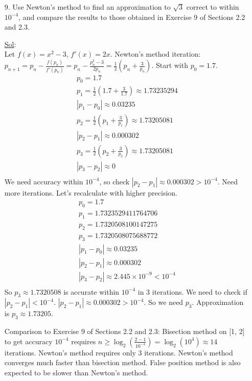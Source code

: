\begin{enumerate}
  \item[9.] Use Newton's method to find an approximation to \(
    \sqrt{3} \) correct to within \( 10^{-4} \), and compare the
    results to those obtained in Exercise 9 of Sections 2.2 and 2.3.

    \underline{Sol}:\\
    Let \( f(x) = x^2 - 3 \), \( f'(x) = 2x \).
    Newton's method iteration: \( p_{n+1} = p_n -
      \frac{f(p_n)}{f'(p_n)} = p_n - \frac{p_n^2 - 3}{2p_n} =
    \frac{1}{2} \left( p_n + \frac{3}{p_n} \right) \).
    Start with \( p_0 = 1.7 \).
    \[
      \begin{array}{l}
        p_0 = 1.7 \\
        p_1 = \frac{1}{2} \left( 1.7 + \frac{3}{1.7} \right) \approx
        1.73235294 \\
        |p_1 - p_0| \approx 0.03235 \\
        p_2 = \frac{1}{2} \left( p_1 + \frac{3}{p_1} \right) \approx
        1.73205081 \\
        |p_2 - p_1| \approx 0.000302 \\
        p_3 = \frac{1}{2} \left( p_2 + \frac{3}{p_2} \right) \approx
        1.73205081 \\
        |p_3 - p_2| \approx 0 \\
      \end{array}
    \]
    We need accuracy within \( 10^{-4} \), so check \( |p_2 - p_1|
    \approx 0.000302 > 10^{-4} \). Need more iterations.
    Let's recalculate with higher precision.
    \[
      \begin{array}{l}
        p_0 = 1.7 \\
        p_1 = 1.7323529411764706 \\
        p_2 = 1.7320508100147275 \\
        p_3 = 1.7320508075688772 \\
        |p_1 - p_0| \approx 0.03235 \\
        |p_2 - p_1| \approx 0.000302 \\
        |p_3 - p_2| \approx 2.445 \times 10^{-9} < 10^{-4} \\
      \end{array}
    \]
    So \( p_3 \approx 1.7320508 \) is accurate within \( 10^{-4} \)
    in 3 iterations.  We need to check if \( |p_2 - p_1| < 10^{-4}
    \). \( |p_2 - p_1| \approx 0.000302 > 10^{-4} \). So we need \(
    p_3 \).  Approximation is \( p_3 \approx 1.73205 \).

    Comparison to Exercise 9 of Sections 2.2 and 2.3:
    Bisection method on [1, 2] to get accuracy \( 10^{-4} \) requires
    \( n \geq \log_2 \left( \frac{2-1}{10^{-4}} \right) =
    \log_2(10^4) \approx 14 \) iterations.
    Newton's method requires only 3 iterations. Newton's method
    converges much faster than bisection method. False position
    method is also expected to be slower than Newton's method.


\end{enumerate}
